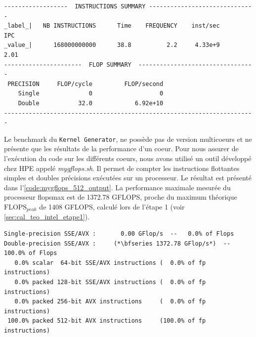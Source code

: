 \begin{minipage}{\linewidth}
\begin{lstlisting}[caption=Résultat de l'exécution du benchmark sur un coeur avec le turbo activé, label={code:kg_512_output},
  basicstyle=\footnotesize, frame=tb,
  xleftmargin=.005\textwidth, xrightmargin=.005\textwidth]
------------------  INSTRUCTIONS SUMMARY ------------------------------
_label_|   NB INSTRUCTIONS      Time    FREQUENCY    inst/sec       IPC
_value_|      168000000000      38.8          2.2     4.33e+9      2.01
----------------------  FLOP SUMMARY  ---------------------------------
 PRECISION     FLOP/cycle         FLOP/second
    Single              0                   0
    Double           32.0            6.92e+10
-----------------------------------------------------------------------
\end{lstlisting}
\end{minipage}
        Le benchmark du \verb=Kernel Generator=, ne possède pas de version multicoeurs et ne présente que les résultats de la performance d'un coeur. Pour nous assurer de l'exécution du code sur les différents coeurs, nous avons utilisé un outil développé chez HPE appelé \textit{mygflops.sh}. Il permet de compter les instructions flottantes simples et doubles précisions exécutées sur un processeur. Le résultat est présenté dans l'\autoref{code:mygflops_512_output}. La performance maximale mesurée du processeur \gls{flopsmax} est de 1372.78 GFLOPS, proche du maximum théorique $\text{FLOPS}_{peak}$ de 1408 GFLOPS, calculé lors de l'étape 1  (voir \autoref{sec:cal_teo_intel_etape1}).
        
\begin{lstlisting}[caption=Résultat de l'outil \textit{myflops.sh} utilisé pour compter les instructions flottantes exécutées sur un processeur., label={code:mygflops_512_output},
  basicstyle=\footnotesize, frame=tb,
  xleftmargin=.005\textwidth, xrightmargin=.005\textwidth]
Single-precision SSE/AVX :       0.00 GFlop/s  --   0.0% of Flops
Double-precision SSE/AVX :     (*\bfseries 1372.78 GFlop/s*)  -- 100.0% of Flops
   0.0% scalar  64-bit SSE/AVX instructions (  0.0% of fp instructions)
   0.0% packed 128-bit SSE/AVX instructions (  0.0% of fp instructions)
   0.0% packed 256-bit AVX instructions     (  0.0% of fp instructions)
 100.0% packed 512-bit AVX instructions     (100.0% of fp instructions)
\end{lstlisting}